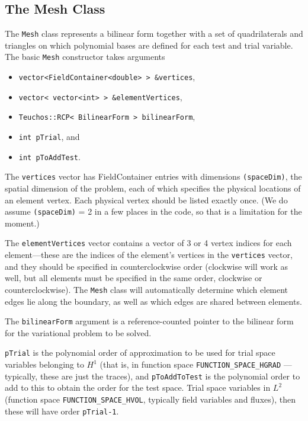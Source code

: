 \subsection{The Mesh Class}\label{NVR:sec:mesh}
The \verb=Mesh= class represents a bilinear form together with a set of quadrilaterals and triangles on which polynomial bases are defined for each test and trial variable.  The basic \verb=Mesh= constructor takes arguments
\begin{itemize}
\item \verb=vector<FieldContainer<double> > &vertices=,
\item \verb=vector< vector<int> > &elementVertices=,
\item \verb=Teuchos::RCP< BilinearForm > bilinearForm=,
\item \verb=int pTrial=, and
\item \verb=int pToAddTest=.
\end{itemize}

The \verb=vertices= vector has FieldContainer entries with dimensions \verb=(spaceDim)=, the spatial dimension of the problem, each of which specifies the physical locations of an element vertex.  Each physical vertex should be listed exactly once.  (We do assume \verb=(spaceDim)= = 2 in a few places in the code, so that is a limitation for the moment.)

The \verb=elementVertices= vector contains a vector of 3 or 4 vertex indices for each element---these are the indices of the element's vertices in the \verb=vertices=  vector, and they should be specified in counterclockwise order (clockwise will work as well, but all elements must be specified in the same order, clockwise or counterclockwise).  The \verb=Mesh= class will automatically determine which element edges lie along the boundary, as well as which edges are shared between elements.

The \verb=bilinearForm= argument is a reference-counted pointer to the bilinear form for the variational problem to be solved.  

\verb=pTrial= is the polynomial order of approximation to be used for trial space variables belonging to $H^{1}$ (that is, in function space \verb=FUNCTION_SPACE_HGRAD= --- typically, these are just the traces), and \verb=pToAddToTest= is the polynomial order to add to this to obtain the order for the test space.  Trial space variables in $L^{2}$ (function space \verb=FUNCTION_SPACE_HVOL=, typically field variables and fluxes), then these will have order \verb=pTrial-1=.

